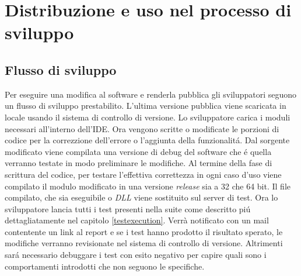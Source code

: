 \chapter{Distribuzione e uso nel processo di sviluppo}
    \section{Flusso di sviluppo}
        Per eseguire una modifica al software e renderla pubblica gli sviluppatori seguono un flusso di sviluppo prestabilito.
        L'ultima versione pubblica viene scaricata in locale usando il sistema di controllo di versione.
        Lo sviluppatore carica i moduli necessari all'interno dell'IDE.
        Ora vengono scritte o modificate le porzioni di codice per la correzzione dell'errore o l'aggiunta della funzionalit\'a.
        Dal sorgente modificato viene compilata una versione di debug del software che \'e quella verranno testate in modo preliminare le modifiche.
        Al termine della fase di scrittura del codice, per testare l'effettiva correttezza in ogni caso d'uso viene compilato il modulo modificato in una versione \textit{release} sia a 32 che 64 bit.
        Il file compilato, che sia eseguibile o \textit{DLL} viene sostituito sul server di test.
        Ora lo sviluppatore lancia tutti i test presenti nella suite come descritto pi\'u dettagliatamente nel capitolo \ref{testexecution}.
        Verrà notificato con un mail contentente un link al report e se i test hanno prodotto il risultato sperato, le modifiche verranno revisionate nel sistema di controllo di versione.
        Altrimenti sar\'a necessario debuggare i test con esito negativo per capire quali sono i comportamenti introdotti che non seguono le specifiche. 

